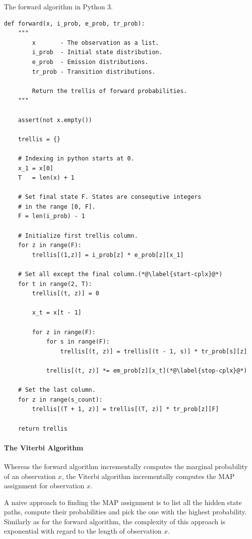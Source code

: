 \begin{algorithm}[!p]
\begin{center}
\caption{The forward algorithm in Python 3.}\label{forward-algorithm}
\begin{lstlisting}[linewidth=\textwidth]
def forward(x, i_prob, e_prob, tr_prob): 
    """
        x       - The observation as a list.
        i_prob  - Initial state distribution.
        e_prob  - Emission distributions.
        tr_prob - Transition distributions.

        Return the trellis of forward probabilities. 
    """

    assert(not x.empty()) 

    trellis = {}

    # Indexing in python starts at 0.
    x_1 = x[0]
    T   = len(x) + 1

    # Set final state F. States are consequtive integers 
    # in the range [0, F]. 
    F = len(i_prob) - 1 

    # Initialize first trellis column.
    for z in range(F):
        trellis[(1,z)] = i_prob[z] * e_prob[z][x_1]

    # Set all except the final column.(*@\label{start-cplx}@*)
    for t in range(2, T):
        trellis[(t, z)] = 0

        x_t = x[t - 1]

        for z in range(F):
            for s in range(F):
                trellis[(t, z)] = trellis[(t - 1, s)] * tr_prob[s][z]

            trellis[(t, z)] *= em_prob[z][x_t](*@\label{stop-cplx}@*)

    # Set the last column.
    for z in range(s_count):
        trellis[(T + 1, z)] = trellis[(T, z)] * tr_prob[z][F]

    return trellis 
\end{lstlisting}
\end{center}
\end{algorithm}

\paragraph{The Viterbi Algorithm}
\label{hmm-viterbi}
Whereas the forward algorithm incrementally computes the marginal
probability of an observation $x$, the Viterbi algorithm incrementally
computes the MAP assignment for observation $x$.

A naive approach to finding the MAP assignment is to list all the
hidden state paths, compute their probabilities and pick the one with
the highest probability. Similarly as for the forward algorithm, the
complexity of this approach is exponential with regard to the length
of observation $x$.

